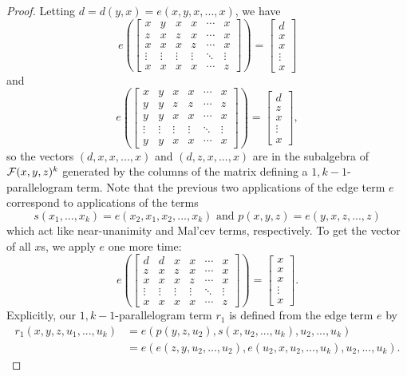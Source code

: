 \documentclass[letterpaper,11pt]{article}
\begin{document}
\begin{proof}
Letting $d = d(y,x) = e(x,y,x,...,x)$, we have
\[
e\left(\begin{bmatrix} x & y & x & x & \cdots & x\\ z & x & z & x & \cdots & x\\ x & x & x & z & \cdots & x\\ \vdots & \vdots & \vdots & \vdots & \ddots & \vdots\\ x & x & x & x & \cdots & z \end{bmatrix}\right) = \begin{bmatrix} d\\ x\\ x\\ \vdots \\ x \end{bmatrix}
\]
and
\[
e\left(\begin{bmatrix} x & y & x & x & \cdots & x\\ y & y & z & z & \cdots & z\\ y & y & x & x & \cdots & x\\ \vdots & \vdots & \vdots & \vdots & \ddots & \vdots\\ y & y & x & x & \cdots & x \end{bmatrix}\right) = \begin{bmatrix} d\\ z\\ x\\ \vdots \\ x \end{bmatrix},
\]
so the vectors $(d,x,x,...,x)$ and $(d,z,x,...,x)$ are in the subalgebra of $\mathcal{F}(x,y,z)^k$ generated by the columns of the matrix defining a $1,k-1$-parallelogram term. Note that the previous two applications of the edge term $e$ correspond to applications of the terms
\[
s(x_1, ..., x_k) = e(x_2, x_1, x_2, ..., x_k) \text{ and } p(x,y,z) = e(y,x,z,...,z)
\]
which act like near-unanimity and Mal'cev terms, respectively. To get the vector of all $x$s, we apply $e$ one more time:
\[
e\left(\begin{bmatrix} d & d & x & x & \cdots & x\\ z & x & z & x & \cdots & x\\ x & x & x & z & \cdots & x\\ \vdots & \vdots & \vdots & \vdots & \ddots & \vdots\\ x & x & x & x & \cdots & z \end{bmatrix}\right) = \begin{bmatrix} x\\ x\\ x\\ \vdots \\ x \end{bmatrix}.
\]
Explicitly, our $1,k-1$-parallelogram term $r_1$ is defined from the edge term $e$ by
\begin{align*}
r_1(x,y,z,u_1,...,u_k) &= e(p(y,z,u_2),s(x,u_2,...,u_k),u_2,...,u_k)\\
&= e(e(z,y,u_2,...,u_2),e(u_2,x,u_2,...,u_k),u_2,...,u_k).
\end{align*}


\end{proof}
\end{document}
